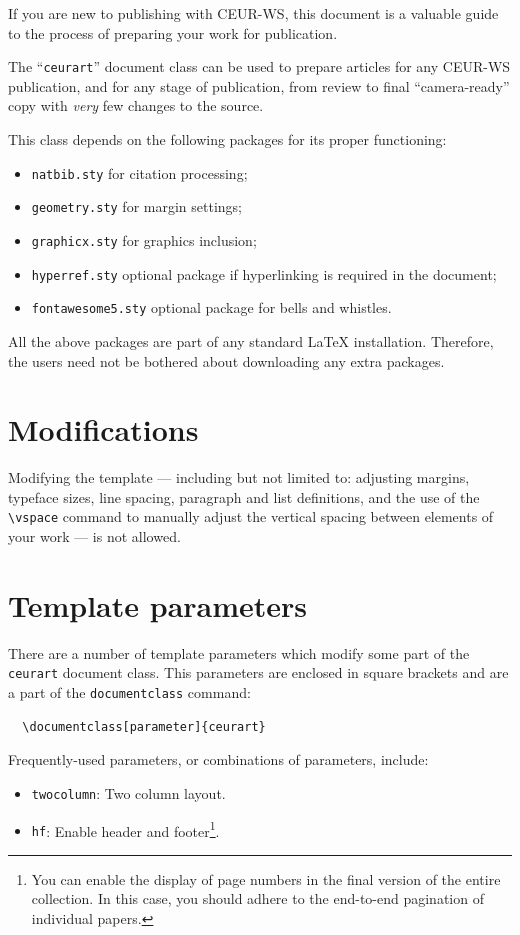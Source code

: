 \documentclass[
]{ceurart}
\begin{document}
If you are new to publishing with CEUR-WS, this document is a valuable
guide to the process of preparing your work for publication.

The ``\verb|ceurart|'' document class can be used to prepare articles
for any CEUR-WS publication, and for any stage of publication, from
review to final ``camera-ready'' copy with {\itshape very} few changes
to the source.

This class depends on the following packages
for its proper functioning:

\begin{itemize}
\item \verb|natbib.sty| for citation processing;
\item \verb|geometry.sty| for margin settings;
\item \verb|graphicx.sty| for graphics inclusion;
\item \verb|hyperref.sty| optional package if hyperlinking is required in
  the document;
\item \verb|fontawesome5.sty| optional package for bells and whistles.
\end{itemize}

All the above packages are part of any
standard \LaTeX{} installation.
Therefore, the users need not be
bothered about downloading any extra packages.

\section{Modifications}

Modifying the template --- including but not limited to: adjusting
margins, typeface sizes, line spacing, paragraph and list definitions,
and the use of the \verb|\vspace| command to manually adjust the
vertical spacing between elements of your work --- is not allowed.

\section{Template parameters}

There are a number of template
parameters which modify some part of the \verb|ceurart| document class.
This parameters are enclosed in square
brackets and are a part of the {\verb|documentclass|} command:
\begin{verbatim}
  \documentclass[parameter]{ceurart}
\end{verbatim}

Frequently-used parameters, or combinations of parameters, include:
\begin{itemize}
\item {\verb|twocolumn|}: Two column layout.
\item {\verb|hf|}: Enable header and footer\footnote{You can enable
    the display of page numbers in the final version of the entire
    collection. In this case, you should adhere to the end-to-end
    pagination of individual papers.}.
\end{itemize}
\end{document}
